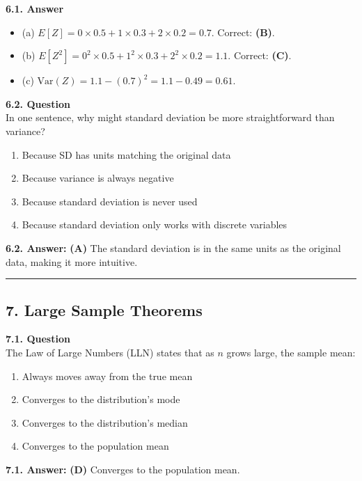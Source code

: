 \documentclass[12pt]{article}
\begin{document}
\noindent
\textbf{6.1. Answer}
\begin{itemize}
\item (a) $E[Z]=0\times0.5+1\times0.3+2\times0.2=0.7.$ Correct: \textbf{(B)}.
\item (b) $E[Z^2]=0^2\times0.5 + 1^2\times0.3 + 2^2\times0.2=1.1.$ Correct: \textbf{(C)}.
\item (c) $\mathrm{Var}(Z)=1.1 - (0.7)^2=1.1-0.49=0.61.$
\end{itemize}

\textbf{6.2. Question}\\
In one sentence, why might standard deviation be more straightforward than variance?
\begin{enumerate}[label=\Alph*.]
\item Because SD has units matching the original data
\item Because variance is always negative
\item Because standard deviation is never used
\item Because standard deviation only works with discrete variables
\end{enumerate}

\noindent
\textbf{6.2. Answer:} \textbf{(A)} The standard deviation is in the same units as the original data, making it more intuitive.

\hrule

\subsection*{7. Large Sample Theorems}

\textbf{7.1. Question}\\
The Law of Large Numbers (LLN) states that as $n$ grows large, the sample mean:
\begin{enumerate}[label=\Alph*.]
\item Always moves away from the true mean
\item Converges to the distribution's mode
\item Converges to the distribution's median
\item Converges to the population mean
\end{enumerate}

\noindent
\textbf{7.1. Answer:} \textbf{(D)} Converges to the population mean.

\bigskip
\end{document}
